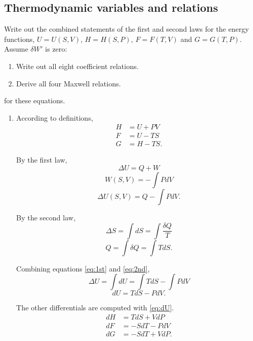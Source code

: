 \begin{@empty}
\section{Thermodynamic variables and relations}
\begin{problem}
    Write out the combined statements of the first and second laws for the
    energy functions, $U = U(S, V)$, $H = H(S, P)$, $F = F(T, V)$ and $G = G(T,
    P)$.  Assume $\delta W'$ is zero:
    \begin{enumerate}
        \item Write out all eight coefficient relations.
        \item Derive all four Maxwell relations.
    \end{enumerate}
    for these equations.
\end{problem}

\begin{answer}
    \begin{enumerate}
        \item According to definitions,
            \begin{align*}
                H &= U + PV \\
                F &= U - TS \\
                G &= H - TS.
            \end{align*}

            By the first law,
            \[ \Delta U = Q + W \]
            \[ W(S, V) = -\int PdV \]
            \begin{equation}
                \Delta U(S, V) = Q -\int PdV. \label{eq:1st}
            \end{equation}

            By the second law,
            \[ \Delta S = \int dS = \int \frac{\delta Q}{T} \]
            \begin{equation}
                Q = \int \delta Q = \int TdS. \label{eq:2nd}
            \end{equation}

            Combining equations \eqref{eq:1st} and \eqref{eq:2nd},
            \[ \Delta U = \int dU = \int TdS - \int PdV \]
            \begin{equation}
                dU = TdS - PdV. \label{eq:dU}
            \end{equation}

            The other differentials are computed with \eqref{eq:dU}.
            \begin{align*}
                dH &= TdS + VdP \\
                dF &= -SdT - PdV \\
                dG &= -SdT + VdP.
            \end{align*}


\end{enumerate}
\end{answer}
\end{@empty}
